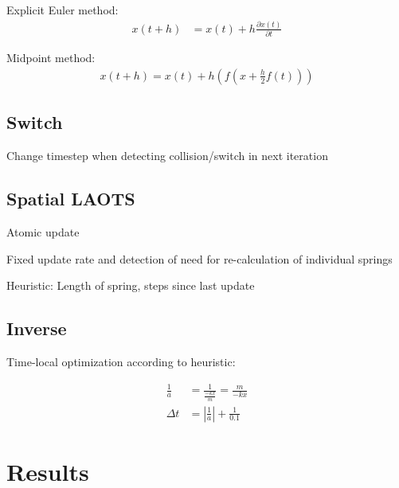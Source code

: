\documentclass[twoside]{article}
\providecommand{\abs}[1]{\left \lvert #1 \right \rvert}
\begin{document}
\begin{multicols}{2}
Explicit Euler method:
\begin{align}
    x(t+h) &= x(t) + h \frac{\partial x(t)}{\partial t}
\end{align}

Midpoint method:
\begin{align}
    x(t+h) = x(t) + h \left( f \left(x + \frac{h}{2} f \left(t \right) \right) \right)
\end{align}

\cite{Keshav:2007}
\subsection{Switch}
Change timestep when detecting collision/switch in next iteration

\subsection{Spatial LAOTS}
Atomic update

Fixed update rate and detection of need for re-calculation of individual springs

Heuristic: Length of spring, steps since last update

\subsection{Inverse}
Time-local optimization according to heuristic:

\begin{align}
    \frac{1}{a} &= \frac{1}{\frac{-kx}{m}} = \frac{m}{-kx} \\
    \Delta t &= \abs{\frac{1}{a}} + \frac{1}{0.1}
\end{align}


\section{Results}



\end{multicols}
\end{document}
